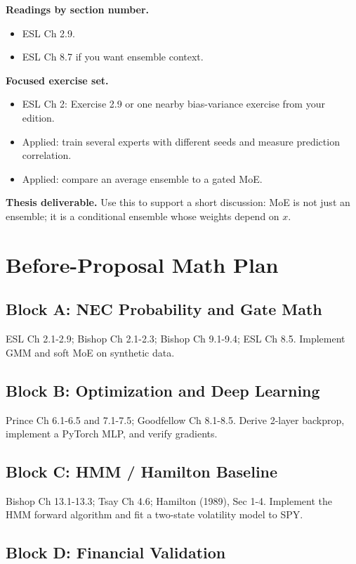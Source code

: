 \documentclass[11pt]{article}
\begin{document}
\textbf{Readings by section number.}
\begin{itemize}
  \item ESL Ch 2.9.
  \item ESL Ch 8.7 if you want ensemble context.
\end{itemize}

\textbf{Focused exercise set.}
\begin{itemize}
  \item ESL Ch 2: Exercise 2.9 or one nearby bias-variance exercise from your edition.
  \item Applied: train several experts with different seeds and measure prediction correlation.
  \item Applied: compare an average ensemble to a gated MoE.
\end{itemize}

\textbf{Thesis deliverable.} Use this to support a short discussion: MoE is not just an ensemble; it is a conditional ensemble whose weights depend on \(x\).

\section{Before-Proposal Math Plan}

\subsection{Block A: NEC Probability and Gate Math}

ESL Ch 2.1-2.9; Bishop Ch 2.1-2.3; Bishop Ch 9.1-9.4; ESL Ch 8.5. Implement GMM and soft MoE on synthetic data.

\subsection{Block B: Optimization and Deep Learning}

Prince Ch 6.1-6.5 and 7.1-7.5; Goodfellow Ch 8.1-8.5. Derive 2-layer backprop, implement a PyTorch MLP, and verify gradients.

\subsection{Block C: HMM / Hamilton Baseline}

Bishop Ch 13.1-13.3; Tsay Ch 4.6; Hamilton (1989), Sec 1-4. Implement the HMM forward algorithm and fit a two-state volatility model to SPY.

\subsection{Block D: Financial Validation}
\end{document}
